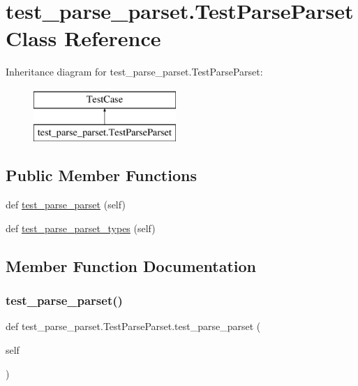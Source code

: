 \hypertarget{classtest__parse__parset_1_1_test_parse_parset}{}\section{test\+\_\+parse\+\_\+parset.\+Test\+Parse\+Parset Class Reference}
\label{classtest__parse__parset_1_1_test_parse_parset}
Inheritance diagram for test\+\_\+parse\+\_\+parset.\+Test\+Parse\+Parset\+:\begin{figure}[H]
\begin{center}
\leavevmode
\includegraphics[height=2.000000cm]{classtest__parse__parset_1_1_test_parse_parset}
\end{center}
\end{figure}
\subsection*{Public Member Functions}
\begin{DoxyCompactItemize}
\item 
def \mbox{\hyperlink{classtest__parse__parset_1_1_test_parse_parset_a7667b127b05e892b15b9682def0fc4bb}{test\+\_\+parse\+\_\+parset}} (self)
\item 
def \mbox{\hyperlink{classtest__parse__parset_1_1_test_parse_parset_aac7bd0b62f4853395c2bb7cd3290bae6}{test\+\_\+parse\+\_\+parset\+\_\+types}} (self)
\end{DoxyCompactItemize}


\subsection{Member Function Documentation}
\mbox{\label{classtest__parse__parset_1_1_test_parse_parset_a7667b127b05e892b15b9682def0fc4bb}} 
\subsubsection{\texorpdfstring{test\_parse\_parset()}{test\_parse\_parset()}}
{\footnotesize\ttfamily def test\+\_\+parse\+\_\+parset.\+Test\+Parse\+Parset.\+test\+\_\+parse\+\_\+parset (\begin{DoxyParamCaption}\item[{}]{self }\end{DoxyParamCaption})}

